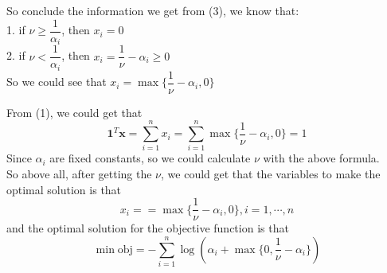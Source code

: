 So conclude the information we get from (3), we know that:\\
1. if $\nu\geq\dfrac{1}{\alpha_i}$, then $x_i=0$\\
2. if $\nu<\dfrac{1}{\alpha_i}$, then $x_i=\dfrac{1}{\nu}-\alpha_i\geq 0$\\
So we could see that $x_i=\max\{\dfrac{1}{\nu}-\alpha_i,0\}$

From (1), we could get that
$$\mathbf{1}^T\mathbf{x}=\sum_{i=1}^nx_i=\sum_{i=1}^n\max\{\dfrac{1}{\nu}-\alpha_i,0\}=1$$
Since $\alpha_i$ are fixed constants, so we could calculate $\nu$ with the above formula.\\
So above all, after getting the $\nu$, we could get that the variables to make the optimal solution is that $$x_i==\max\{\dfrac{1}{\nu}-\alpha_i,0\}, i=1,\cdots,n$$
and the optimal solution for the objective function is that
$$\min \text{obj} = -\sum_{i=1}^n\log \left(\alpha_i+\max\{ 0, \dfrac{1}{\nu}-\alpha_i \} \right)$$